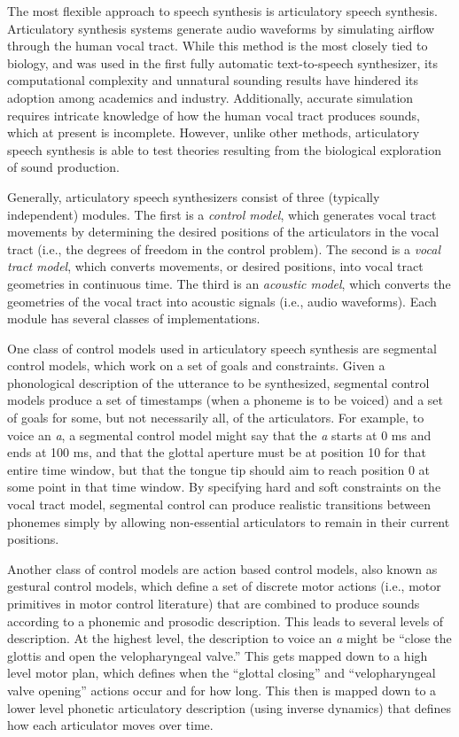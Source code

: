 \documentclass{article}
\begin{document}
The most flexible approach to speech synthesis
is articulatory speech synthesis.
Articulatory synthesis systems generate
audio waveforms by simulating
airflow through the human vocal tract.
While this method is
the most closely tied to biology,
and was used in the first fully automatic
text-to-speech synthesizer,
its computational complexity
and unnatural sounding results
have hindered its adoption
among academics and industry.
Additionally, accurate simulation
requires intricate knowledge
of how the human vocal tract
produces sounds,
which at present is incomplete.
However, unlike other methods,
articulatory speech synthesis
is able to test theories
resulting from the biological exploration
of sound production.

Generally, articulatory speech synthesizers
consist of three (typically independent) modules.
The first is a \textit{control model},
which generates vocal tract movements
by determining the desired positions
of the articulators in the vocal tract
(i.e., the degrees of freedom in the control problem).
The second is a \textit{vocal tract model},
which converts movements, or desired positions,
into vocal tract geometries in continuous time.
The third is an \textit{acoustic model},
which converts the geometries of the vocal tract
into acoustic signals (i.e., audio waveforms).
Each module has several classes of implementations.

One class of control models used in
articulatory speech synthesis
are segmental control models,
which work on a set of goals and constraints.
Given a phonological description
of the utterance to be synthesized,
segmental control models
produce a set of timestamps
(when a phoneme is to be voiced)
and a set of goals for some,
but not necessarily all,
of the articulators.
For example, to voice an \textit{a},
a segmental control model might say
that the \textit{a} starts at 0 ms
and ends at 100 ms,
and that the glottal aperture
must be at position 10
for that entire time window,
but that the tongue tip
should aim to reach position 0
at some point in that time window.
By specifying hard and soft constraints
on the vocal tract model,
segmental control can produce
realistic transitions between
phonemes simply by allowing
non-essential articulators to
remain in their current positions.

Another class of control models are
action based control models,
also known as gestural control models,
which define a set of discrete motor actions
(i.e., motor primitives in motor control literature)
that are combined to produce sounds according
to a phonemic and prosodic description.
This leads to several levels of description.
At the highest level,
the description to voice an \textit{a}
might be
``close the glottis
and open the velopharyngeal valve.''
This gets mapped down to a
high level motor plan,
which defines when the ``glottal closing''
and ``velopharyngeal valve opening''
actions occur and for how long.
This then is mapped down
to a lower level phonetic articulatory description
(using inverse dynamics)
that defines how each articulator
moves over time.
\end{document}
